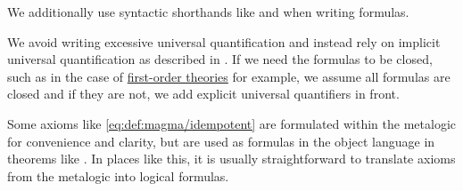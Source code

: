 \begin{remark}
\begin{thmenum}
     We additionally use syntactic shorthands like  and  when writing formulas.

     We avoid writing excessive universal quantification and instead rely on implicit universal quantification as described in . If we need the formulas to be closed, such as in the case of \hyperref[def:first_order_theory]{first-order theories} for example, we assume all formulas are closed and if they are not, we add explicit universal quantifiers in front.
  \end{thmenum}

  Some axioms like \eqref{eq:def:magma/idempotent} are formulated within the metalogic for convenience and clarity, but are used as formulas in the object language in theorems like . In places like this, it is usually straightforward to translate axioms from the metalogic into logical formulas.
\end{remark}

